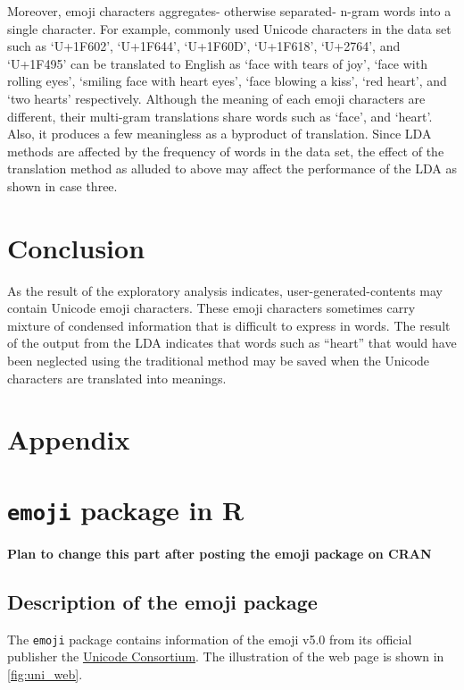 \documentclass[]{article}
\begin{document}
Moreover, emoji characters aggregates- otherwise separated- n-gram words
into a single character. For example, commonly used Unicode characters
in the data set such as `U+1F602', `U+1F644', `U+1F60D', `U+1F618',
`U+2764', and `U+1F495' can be translated to English as `face with tears
of joy', `face with rolling eyes', `smiling face with heart eyes', `face
blowing a kiss', `red heart', and `two hearts' respectively. Although
the meaning of each emoji characters are different, their multi-gram
translations share words such as `face', and `heart'. Also, it produces
a few meaningless as a byproduct of translation. Since LDA methods are
affected by the frequency of words in the data set, the effect of the
translation method as alluded to above may affect the performance of the
LDA as shown in case three.

\section{Conclusion}\label{conclusion}

As the result of the exploratory analysis indicates,
user-generated-contents may contain Unicode emoji characters. These
emoji characters sometimes carry mixture of condensed information that
is difficult to express in words. The result of the output from the LDA
indicates that words such as ``heart'' that would have been neglected
using the traditional method may be saved when the Unicode characters
are translated into meanings.

\section{Appendix}\label{appendix}

\section{\texorpdfstring{\texttt{emoji} package in
R}{emoji package in R}}\label{emoji-package-in-r}

\textbf{Plan to change this part after posting the emoji package on CRAN}

\subsection{Description of the emoji
package}\label{description-of-the-emoji-package}

The \texttt{emoji} package contains information of the emoji v5.0 from
its official publisher the
\href{http://unicode.org/emoji/charts/emoji-list.html}{Unicode Consortium}.
The illustration of the web page is shown in \autoref{fig:uni_web}.
\end{document}

